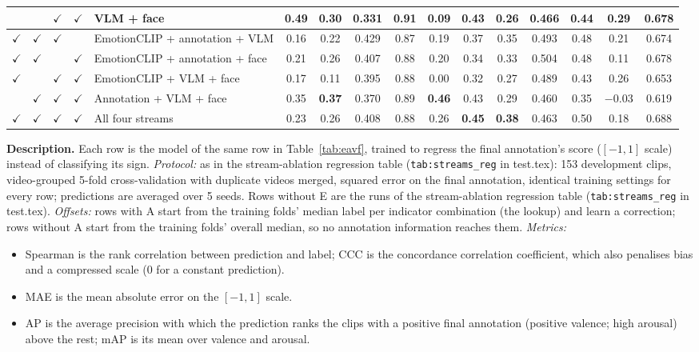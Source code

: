 \documentclass[11pt]{article}
\newcommand{\code}[1]{\texttt{#1}}
\newcommand{\best}[1]{\textbf{#1}}
\newcommand{\tabledesc}[1]{\par\medskip\begin{minipage}{\linewidth}\footnotesize\textbf{Description.} #1\end{minipage}}
\begin{document}
\begin{table}[!htbp]
{\begin{tabular}{cccclccccccccccc}
 &  & $\checkmark$ & $\checkmark$ & VLM + face & \best{0.49} & 0.30 & \best{0.331} & \best{0.91} & 0.09 & 0.43 & 0.26 & 0.466 & 0.44 & \best{0.29} & 0.678 \\
\midrule
$\checkmark$ & $\checkmark$ & $\checkmark$ &  & EmotionCLIP + annotation + VLM & 0.16 & 0.22 & 0.429 & 0.87 & 0.19 & 0.37 & 0.35 & 0.493 & 0.48 & 0.21 & 0.674 \\
$\checkmark$ & $\checkmark$ &  & $\checkmark$ & EmotionCLIP + annotation + face & 0.21 & 0.26 & 0.407 & 0.88 & 0.20 & 0.34 & 0.33 & 0.504 & 0.48 & 0.11 & 0.678 \\
$\checkmark$ &  & $\checkmark$ & $\checkmark$ & EmotionCLIP + VLM + face & 0.17 & 0.11 & 0.395 & 0.88 & 0.00 & 0.32 & 0.27 & 0.489 & 0.43 & 0.26 & 0.653 \\
 & $\checkmark$ & $\checkmark$ & $\checkmark$ & Annotation + VLM + face & 0.35 & \best{0.37} & 0.370 & 0.89 & \best{0.46} & 0.43 & 0.29 & 0.460 & 0.35 & $-$0.03 & 0.619 \\
\midrule
$\checkmark$ & $\checkmark$ & $\checkmark$ & $\checkmark$ & All four streams & 0.23 & 0.26 & 0.408 & 0.88 & 0.26 & \best{0.45} & \best{0.38} & 0.463 & 0.50 & 0.18 & 0.688 \\
\bottomrule
\end{tabular}%
}
\tabledesc{Each row is the model of the same row in Table~\ref{tab:eavf}, trained to regress the final annotation's score ($[-1, 1]$ scale) instead of classifying its sign.
\emph{Protocol:} as in the stream-ablation regression table (\code{tab:streams\_reg} in test.tex): 153 development clips, video-grouped 5-fold cross-validation with duplicate videos merged, squared error on the final annotation, identical training settings for every row; predictions are averaged over 5 seeds. Rows without E are the runs of the stream-ablation regression table (\code{tab:streams\_reg} in test.tex).
\emph{Offsets:} rows with A start from the training folds' median label per indicator combination (the lookup) and learn a correction; rows without A start from the training folds' overall median, so no annotation information reaches them.
\emph{Metrics:}
\begin{itemize}
  \item Spearman is the rank correlation between prediction and label; CCC is the concordance correlation coefficient, which also penalises bias and a compressed scale (0 for a constant prediction).
  \item MAE is the mean absolute error on the $[-1, 1]$ scale.
  \item AP is the average precision with which the prediction ranks the clips with a positive final annotation (positive valence; high arousal) above the rest; mAP is its mean over valence and arousal.

\end{itemize}}
\end{table}
\end{document}
